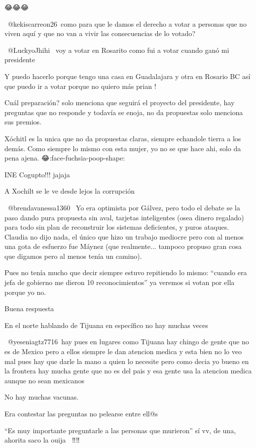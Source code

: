 😂😂😂

​ @kekiscarreon26 como para que le damos el derecho a votar a personas que no viven aquí y que no van a vivir las consecuencias de lo votado?

 @LuckyoJhihi  voy a votar en Rosarito  como fui a votar cuando ganó mi presidente💪💪💪💪

Y puedo hacerlo porque tengo una casa en Guadalajara y otra en Rosario BC así que puedo ir a votar porque no quiero más prian !

Cuál preparación? solo menciona que seguirá el proyecto del presidente, hay preguntas que no responde y todavía se enoja, no da propuestas solo menciona sus premios.

Xóchitl es la unica que no da propuestas claras, siempre echandole tierra a los demás. Como siempre lo mismo con esta mujer, yo no se que hace ahi, solo da pena ajena. 😂:face-fuchsia-poop-shape:

INE Cogupto!!! jajaja

A Xochilt se le ve desde lejos la corrupción

 @brendavanessa1360  Yo era optimista por Gálvez, pero todo el debate se la paso dando pura propuesta sin aval, tarjetas inteligentes (osea dinero regalado) para todo sin plan de reconstruir los sistemas deficientes, y puros ataques.
Claudia no dijo nada, el único que hizo un trabajo mediocre pero con al menos una gota de esfuerzo fue Máynez (que realmente... tampoco propuso gran cosa que digamos pero al menos tenía un camino).

Pues no tenía mucho que decir siempre estuvo repitiendo lo mismo: “cuando era jefa de gobierno me dieron 10 reconocimientos” ya veremos si votan por ella porque yo no.

Buena respuesta 👌🏻

En el norte hablando de Tijuana en específico no hay muchas veces

​ @yeseniagtz7716 hay pues en lugares como Tijuana hay chingo de gente que no es de Mexico pero a ellos siempre le dan atencion medica y esta bien no lo veo mal pues hay que darle la mano a quien lo necesite pero como decia yo bueno en la frontera hay mucha gente que no es del pais y esa gente usa la atencion medica aunque no sean mexicanos

No hay muchas vacunas.

Era contestar las preguntas no pelearse entre ell@s 🫠

“Es muy importante preguntarle a las personas que murieron” sí vv, de una, ahorita saco la ouija 🫦🫦‼️‼️

